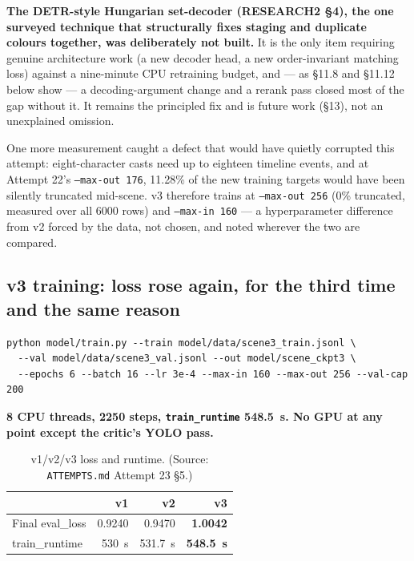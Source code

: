 \documentclass[11pt]{article}
\newcommand{\secsym}{\S}
\begin{document}
\textbf{The DETR-style Hungarian set-decoder (RESEARCH2 \secsym4), the
one surveyed technique that structurally fixes staging and duplicate
colours together, was deliberately not built.} It is the only item
requiring genuine architecture work (a new decoder head, a new
order-invariant matching loss) against a nine-minute CPU retraining
budget, and --- as \secsym11.8 and \secsym11.12 below show --- a
decoding-argument change and a rerank pass closed most of the gap without
it. It remains the principled fix and is future work (\secsym13), not an
unexplained omission.

One more measurement caught a defect that would have quietly corrupted
this attempt: eight-character casts need up to eighteen timeline events,
and at Attempt 22's \texttt{--max-out 176}, 11.28\% of the new training
targets would have been silently truncated mid-scene. v3 therefore
trains at \texttt{--max-out 256} (0\% truncated, measured over all 6000
rows) and \texttt{--max-in 160} --- a hyperparameter difference from v2
forced by the data, not chosen, and noted wherever the two are compared.

\subsection{v3 training: loss rose again, for the third time and the same reason}
\label{sec:v3training}

\begin{verbatim}
python model/train.py --train model/data/scene3_train.jsonl \
  --val model/data/scene3_val.jsonl --out model/scene_ckpt3 \
  --epochs 6 --batch 16 --lr 3e-4 --max-in 160 --max-out 256 --val-cap 200
\end{verbatim}

\textbf{8 CPU threads, 2250 steps, \texttt{train\_runtime} 548.5~s. No
GPU at any point except the critic's YOLO pass.}

\begin{table}[h]
\centering
\caption{v1/v2/v3 loss and runtime. (Source: \texttt{ATTEMPTS.md} Attempt 23 \secsym5.)}
\label{tab:v3loss}
\begin{tabular}{@{}lrrr@{}}
\toprule
 & v1 & v2 & v3 \\
\midrule
Final eval\_loss & 0.9240 & 0.9470 & \textbf{1.0042} \\
train\_runtime & 530~s & 531.7~s & \textbf{548.5~s} \\
\bottomrule
\end{tabular}
\end{table}
\end{document}
